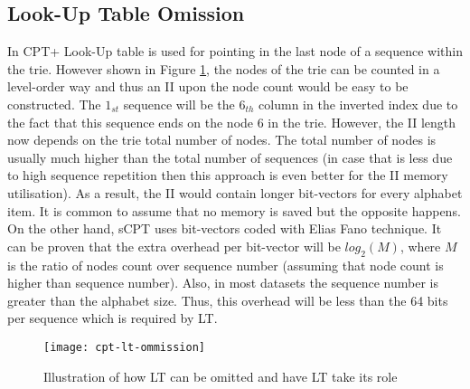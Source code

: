 \subsection{Look-Up Table Omission}
In CPT+ Look-Up table is used for pointing in the last node of a sequence within the trie. However shown in Figure \ref{fig:LT-ommission}, the nodes of the trie can be counted in a level-order way and thus an II upon the node count would be easy to be constructed. The $1_{st}$ sequence will be the $6_{th}$ column in the inverted index due to the fact that this sequence ends on the node 6 in the trie. However, the II length now depends on the trie total number of nodes. The total number of nodes is usually much higher than the total number of sequences (in case that is less due to high sequence repetition then this approach is even better for the II memory utilisation). As a result, the II would contain longer bit-vectors for every alphabet item. It is common to assume that no memory is saved but the opposite happens. On the other hand, sCPT uses bit-vectors coded with Elias Fano technique. It can be proven that the extra overhead per bit-vector will be $log_2(M)$, where $M$ is the ratio of nodes count over sequence number (assuming that node count is higher than sequence number). Also, in most datasets the sequence number is greater than the alphabet size. Thus, this overhead will be less than the 64 bits per sequence which is required by LT. 

\begin{figure}[h]
    \centering
    \texttt{[image: cpt-lt-ommission]}
    \caption{Illustration of how LT can be omitted and have LT take its role}
    \label{fig:LT-ommission}
\end{figure}

